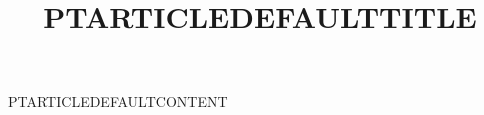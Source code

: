 \documentclass[nominted]{pt-article}
\title{PTARTICLEDEFAULTTITLE}
\begin{document}
\makeatletter
{}
\makeatother
\noindent PTARTICLEDEFAULTCONTENT
\end{document}

